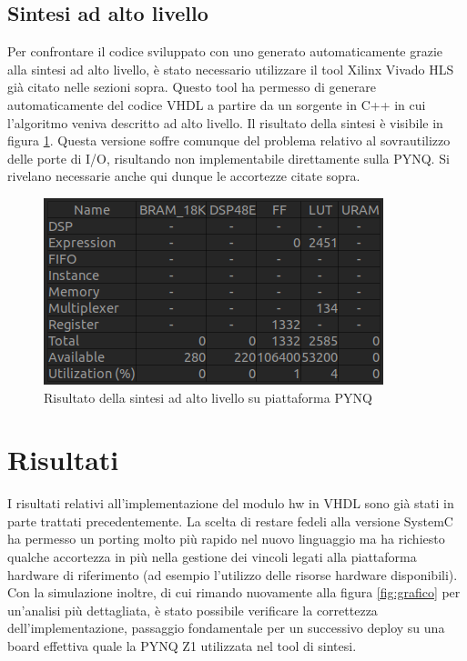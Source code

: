 \documentclass[]{IEEEtran}
\begin{document}
\subsection{Sintesi ad alto livello}
Per confrontare il codice sviluppato con uno generato automaticamente grazie alla sintesi ad alto livello, \`e stato
necessario utilizzare il tool Xilinx Vivado HLS gi\`a citato nelle sezioni sopra.
Questo tool ha permesso di generare automaticamente del codice VHDL a partire da un sorgente in C++ in cui l'algoritmo
veniva descritto ad alto livello. Il risultato della sintesi è visibile in figura \ref{fig:hls}.
Questa versione soffre comunque del problema relativo al sovrautilizzo delle porte di I/O, risultando non implementabile
direttamente sulla PYNQ. Si rivelano necessarie anche qui dunque le accortezze citate sopra.

\begin{figure}[tb]
	\centering
	\includegraphics[width=0.7\columnwidth]{figures/syn_hls.png}
	\caption{Risultato della sintesi ad alto livello su piattaforma PYNQ}
	\label{fig:hls}
\end{figure}


\section{Risultati}
I risultati relativi all'implementazione del modulo hw in VHDL sono gi\`a stati in parte trattati precedentemente. La 
scelta di restare fedeli alla versione SystemC ha permesso un porting molto pi\`u rapido nel nuovo linguaggio ma ha 
richiesto qualche accortezza in pi\`u nella gestione dei vincoli legati alla piattaforma hardware di riferimento 
(ad esempio l'utilizzo delle risorse hardware disponibili). Con la simulazione inoltre, di cui rimando nuovamente alla 
figura \ref{fig:grafico} per un'analisi pi\`u dettagliata, \`e stato possibile verificare la correttezza 
dell'implementazione, passaggio fondamentale per un successivo deploy su una board effettiva quale la PYNQ Z1 utilizzata
nel tool di sintesi.
\end{document}

